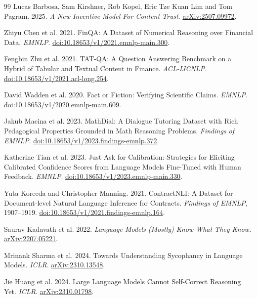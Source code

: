 {\raggedright
\begin{thebibliography}{99}
\setlength{\itemsep}{2pt}
\setlength{\parsep}{0pt}
 Lucas Barbosa, Sam Kirshner, Rob Kopel,
Eric Tze Kuan Lim and Tom Pagram. 2025.
\emph{A New Incentive Model For Content Trust}.
\href{https://arxiv.org/abs/2507.09972}{arXiv:2507.09972}.

 Zhiyu Chen et al. 2021.
FinQA: A Dataset of Numerical Reasoning over Financial Data.
\emph{EMNLP}.
\href{https://aclanthology.org/2021.emnlp-main.300/}{doi:10.18653/v1/2021.emnlp-main.300}.

 Fengbin Zhu et al. 2021.
TAT-QA: A Question Answering Benchmark on a Hybrid of Tabular and Textual Content in Finance.
\emph{ACL-IJCNLP}.
\href{https://aclanthology.org/2021.acl-long.254/}{doi:10.18653/v1/2021.acl-long.254}.

 David Wadden et al. 2020.
Fact or Fiction: Verifying Scientific Claims.
\emph{EMNLP}.
\href{https://aclanthology.org/2020.emnlp-main.609/}{doi:10.18653/v1/2020.emnlp-main.609}.

 Jakub Macina et al. 2023.
MathDial: A Dialogue Tutoring Dataset with Rich Pedagogical Properties Grounded in Math Reasoning Problems.
\emph{Findings of EMNLP}.
\href{https://aclanthology.org/2023.findings-emnlp.372/}{doi:10.18653/v1/2023.findings-emnlp.372}.

 Katherine Tian et al. 2023.
Just Ask for Calibration: Strategies for Eliciting Calibrated Confidence Scores from Language Models Fine-Tuned with Human Feedback.
\emph{EMNLP}.
\href{https://aclanthology.org/2023.emnlp-main.330/}{doi:10.18653/v1/2023.emnlp-main.330}.

 Yuta Koreeda and Christopher Manning. 2021.
ContractNLI: A Dataset for Document-level Natural Language Inference for Contracts.
\emph{Findings of EMNLP}, 1907--1919.
\href{https://aclanthology.org/2021.findings-emnlp.164/}{doi:10.18653/v1/2021.findings-emnlp.164}.

 Saurav Kadavath et al. 2022.
\emph{Language Models (Mostly) Know What They Know.}
\href{https://arxiv.org/abs/2207.05221}{arXiv:2207.05221}.

 Mrinank Sharma et al. 2024.
Towards Understanding Sycophancy in Language Models. \emph{ICLR}.
\href{https://arxiv.org/abs/2310.13548}{arXiv:2310.13548}.

 Jie Huang et al. 2024.
Large Language Models Cannot Self-Correct Reasoning Yet. \emph{ICLR}.
\href{https://arxiv.org/abs/2310.01798}{arXiv:2310.01798}.


\end{thebibliography}}
